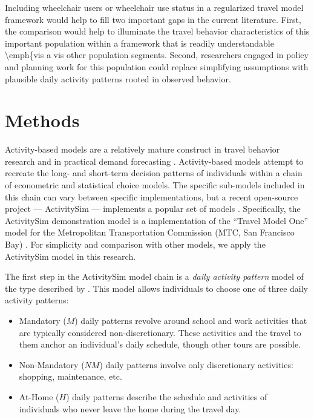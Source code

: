 \documentclass[3p, authoryear, review]{elsarticle} %
\providecommand{\tightlist}{%
  \setlength{\itemsep}{0pt}\setlength{\parskip}{0pt}}
\begin{document}
Including wheelchair users or wheelchair use status in a regularized travel model
framework would help to fill two important gaps in the current literature. First,
the comparison would help to illuminate the travel behavior characteristics of
this important population within a framework that is readily understandable
\textbackslash emph\{vis a vis other population segments. Second, researchers engaged in
policy and planning work for this population could replace simplifying assumptions
with plausible daily activity patterns rooted in observed behavior.

\hypertarget{methodology}{%
\section{Methods}\label{methodology}}

Activity-based models are a relatively mature construct in travel behavior
research and in practical demand forecasting \citep{rasouli2014activity}. Activity-based models attempt
to recreate the long- and short-term decision patterns of individuals within a
chain of econometric and statistical choice models. The specific sub-models included
in this chain can vary between specific implementations, but a recent
open-source project --- ActivitySim \citep{activitysim} --- implements a popular
set of models \citep{davidson2010ct}. Specifically, the ActivitySim demonstration
model is a implementation of the ``Travel Model One'' model for the Metropolitan
Transportation Commission (MTC, San Francisco Bay) \citep{erhardt2012mtc}.
For simplicity and comparison with other models, we apply the ActivitySim model
in this research.

The first step in the ActivitySim model chain is a \emph{daily activity pattern}
model of the type described by \citet{Bradley2005}. This model
allows individuals to choose one of three daily activity patterns:

\begin{itemize}
\tightlist
\item
  Mandatory (\(M\)) daily patterns revolve around school and work activities that
  are typically considered non-discretionary. These activities and the travel
  to them anchor an individual's daily schedule, though other tours are possible.
\item
  Non-Mandatory (\(NM\)) daily patterns involve only discretionary activities:
  shopping, maintenance, etc.
\item
  At-Home (\(H\)) daily patterns describe the schedule and activities of
  individuals who never leave the home during the travel day.
\end{itemize}
\end{document}
